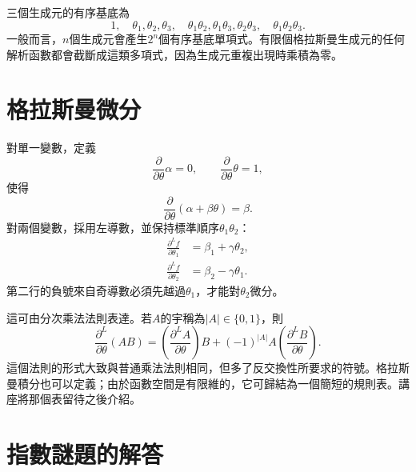 \begin{classroomqa}
\end{classroomqa}

三個生成元的有序基底為
\begin{equation}
1,\quad
\theta_1,\theta_2,\theta_3,\quad
\theta_1\theta_2,\theta_1\theta_3,\theta_2\theta_3,\quad
\theta_1\theta_2\theta_3.
\end{equation}
一般而言，\(n\)個生成元會產生\(2^n\)個有序基底單項式。有限個格拉斯曼生成元的任何解析函數都會截斷成這類多項式，因為生成元重複出現時乘積為零。

\section{格拉斯曼微分}

對單一變數，定義
\begin{equation}
\frac{\partial}{\partial\theta}\alpha=0,
\qquad
\frac{\partial}{\partial\theta}\theta=1,
\end{equation}
使得
\begin{equation}
\frac{\partial}{\partial\theta}
(\alpha+\beta\theta)=\beta.
\end{equation}
對兩個變數，採用左導數，並保持標準順序\(\theta_1\theta_2\)：
\begin{align}
\frac{\partial^L f}{\partial\theta_1}
&=\beta_1+\gamma\theta_2,\\
\frac{\partial^L f}{\partial\theta_2}
&=\beta_2-\gamma\theta_1.
\end{align}
第二行的負號來自奇導數必須先越過\(\theta_1\)，才能對\(\theta_2\)微分。

這可由分次乘法法則表達。若\(A\)的宇稱為\(|A|\in\{0,1\}\)，則
\begin{equation}
\frac{\partial^L}{\partial\theta}(AB)
=\left(\frac{\partial^L A}{\partial\theta}\right)B
+(-1)^{|A|}A
\left(\frac{\partial^L B}{\partial\theta}\right).
\end{equation}
這個法則的形式大致與普通乘法法則相同，但多了反交換性所要求的符號。格拉斯曼積分也可以定義；由於函數空間是有限維的，它可歸結為一個簡短的規則表。講座將那個表留待之後介紹。

\section{指數謎題的解答}

